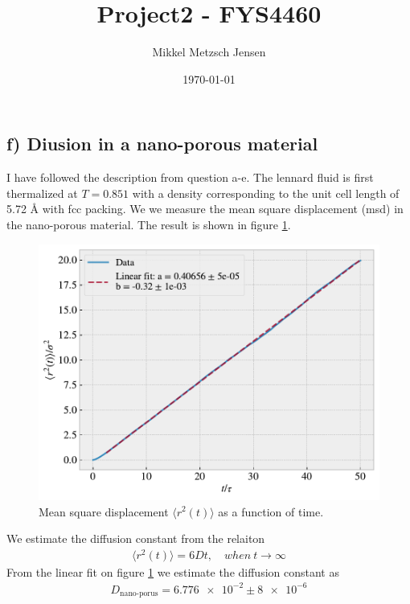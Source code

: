 \documentclass[reprint, amsmath, amssymb, aps]{revtex4-2}
\begin{document}
\title{Project2 - FYS4460}
\author{Mikkel Metzsch Jensen}

\date{\today}
\maketitle

\subsection*{f) Di usion in a nano-porous material}
I have followed the description from question a-e. The lennard  fluid is first thermalized at $T = 0.851$ with a density corresponding to the unit cell length of 5.72 Å with fcc packing. We we measure the mean square displacement (msd) in the nano-porous material. The result is shown in figure \ref{fig:msd}.
\begin{figure}[H]
  \includegraphics[width=\linewidth]{figures/msd.pdf}
  \caption{Mean square displacement $\langle r^2(t) \rangle$ as a function of time.}
  \label{fig:msd}
\end{figure}
We estimate the diffusion constant from the relaiton
\begin{align}
  \langle r^2(t) \rangle = 6Dt, \quad when \ t \rightarrow \infty
  \label{eq:diffusion}
\end{align}
From the linear fit on figure \ref{fig:msd} we estimate the diffusion constant  as
\begin{align*}
  D_{\text{nano-porus}} = \num{6.776e-2} \pm \num{8e-6}
\end{align*}
\end{document}
